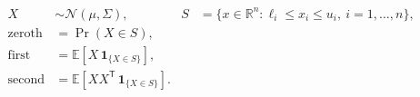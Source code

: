 \documentclass[border=8pt]{standalone}
\begin{document}
$\begin{aligned}
X &\sim \mathcal{N}(\mu,\Sigma),
& S &= \{x \in \mathbb{R}^{n}: \ell_i \le x_i \le u_i,\ i=1,\ldots,n\}, \\
\text{zeroth} &= \Pr(X \in S), \\
\text{first} &= \mathbb{E}\!\left[X\,\mathbf{1}_{\{X\in S\}}\right], \\
\text{second} &= \mathbb{E}\!\left[XX^{\mathsf{T}}\,\mathbf{1}_{\{X\in S\}}\right].
\end{aligned}$
\end{document}
